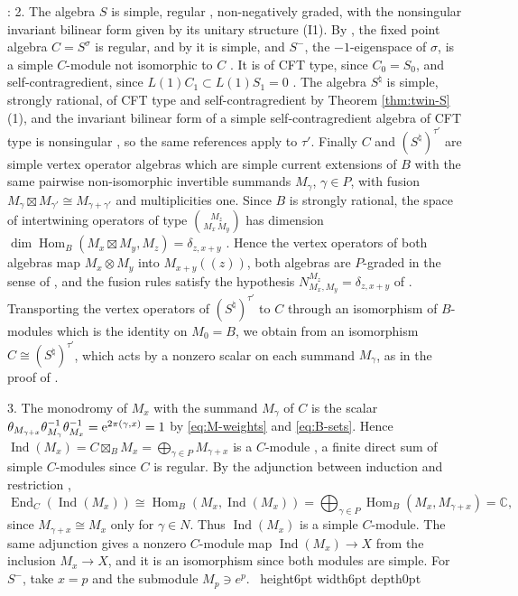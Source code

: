 \documentclass[leqno]{article}
\newcommand{\Cbb}{\ensuremath{\mathbb{C}}}
\newcommand{\qed}{\hfill \vrule height6pt  width6pt depth0pt}
\newcommand{\ot}{\otimes}
\let\i\relax
\newcommand{\i}{\mathrm{i}}
\newcommand{\e}{\mathrm{e}}
\DeclareMathOperator{\Ind}{Ind}
\newenvironment{proof}[1][]{\noindent {\it Proof #1} : }{\hbox{~}\qed
\smallskip
}
\numberwithin{equation}{section}
\begin{document}
\begin{proof}
2. The algebra $S$ is simple, regular \cite{ABD04}, non-negatively graded, with the nonsingular invariant bilinear form given by its unitary structure (I1). By \cite[Theorem 5.24 p.~33]{CaM16}, the fixed point algebra $C = S^\sigma$ is regular, and by \cite[Theorem 4.4]{DoM97} it is simple, and $S^-$, the $-1$-eigenspace of $\sigma$, is a simple $C$-module not isomorphic to $C$ \cite[Theorem 3]{DoM97}. It is of CFT type, since $C_0 = S_0$, and self-contragredient, since $L(1)C_1 \subset L(1)S_1 = 0$ \cite{Li94}. The algebra $S^\natural$ is simple, strongly rational, of CFT type and self-contragredient by Theorem \ref{thm:twin-S}(1), and the invariant bilinear form of a simple self-contragredient algebra of CFT type is nonsingular \cite{Li94}, so the same references apply to $\tau'$. Finally $C$ and $(S^\natural)^{\tau'}$ are simple vertex operator algebras which are simple current extensions of $B$ with the same pairwise non-isomorphic invertible summands $M_\gamma$, $\gamma \in P$, with fusion $M_\gamma \boxtimes M_{\gamma'} \cong M_{\gamma+\gamma'}$ and multiplicities one. Since $B$ is strongly rational, the space of intertwining operators of type $\binom{M_z}{M_x\,M_y}$ has dimension $\dim\operatorname{Hom}_B(M_x \boxtimes M_y,M_z) = \delta_{z,x+y}$ \cite{HL95,Hua08}. Hence the vertex operators of both algebras map $M_x \ot M_y$ into $M_{x+y}((z))$, both algebras are $P$-graded in the sense of \cite[Definition 5.2]{DoM04}, and the fusion rules satisfy the hypothesis $N_{M_x,M_y}^{M_z} = \delta_{z,x+y}$ of \cite[Proposition 5.3]{DoM04}. Transporting the vertex operators of $(S^\natural)^{\tau'}$ to $C$ through an isomorphism of $B$-modules which is the identity on $M_0 = B$, we obtain from \cite[Proposition 5.3]{DoM04} an isomorphism $C \cong (S^\natural)^{\tau'}$, which acts by a nonzero scalar on each summand $M_\gamma$, as in the proof of \cite[Theorem 12.3(2)]{Arh26}.

3. The monodromy of $M_x$ with the summand $M_\gamma$ of $C$ is the scalar $\theta_{M_{\gamma+x}}\theta_{M_\gamma}^{-1}\theta_{M_x}^{-1} = \e^{2\pi\i(\gamma,x)} = 1$ by \eqref{eq:M-weights} and \eqref{eq:B-sets}. Hence $\Ind(M_x) = C \boxtimes_B M_x = \bigoplus_{\gamma \in P} M_{\gamma+x}$ is a $C$-module \cite{HKL15,CKM22}, a finite direct sum of simple $C$-modules since $C$ is regular. By the adjunction between induction and restriction \cite[Theorem 1.6 p.~7]{KiO02},
\[
\operatorname{End}_C(\Ind(M_x)) \cong \operatorname{Hom}_B(M_x,\Ind(M_x)) = \bigoplus_{\gamma \in P}\operatorname{Hom}_B(M_x,M_{\gamma+x}) = \Cbb,
\]
since $M_{\gamma+x} \cong M_x$ only for $\gamma \in N$. Thus $\Ind(M_x)$ is a simple $C$-module. The same adjunction gives a nonzero $C$-module map $\Ind(M_x) \to X$ from the inclusion $M_x \to X$, and it is an isomorphism since both modules are simple. For $S^-$, take $x = p$ and the submodule $M_p \ni e^p$.
\end{proof}
\end{document}
